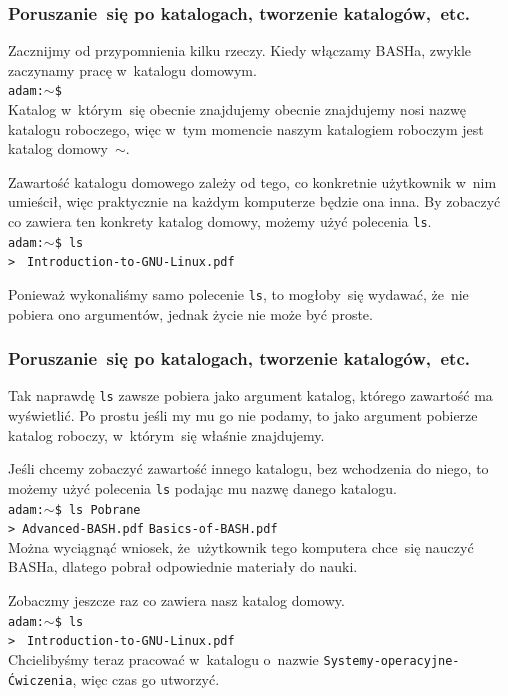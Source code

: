 \documentclass[10pt,t]{beamer}
\begin{document}
\begin{frame}
  \frametitle{Poruszanie~się po katalogach, tworzenie
    katalogów,~etc.}


  Zacznijmy od przypomnienia kilku rzeczy. Kiedy włączamy BASHa, zwykle
  zaczynamy pracę w~katalogu domowym. \\
  \texttt{adam:$\sim$\$} \\
  Katalog w~którym~się obecnie znajdujemy obecnie znajdujemy nosi nazwę
  katalogu roboczego, więc w~tym momencie naszym katalogiem roboczym jest
  katalog domowy~$\sim$.

  Zawartość katalogu domowego zależy od tego, co konkretnie użytkownik
  w~nim umieścił, więc praktycznie na każdym komputerze będzie ona inna.
  By zobaczyć co zawiera ten konkrety katalog domowy, możemy użyć polecenia
  \texttt{ls}. \\
  \texttt{adam:$\sim$\$ ls} \\
  \texttt{> } \quad
  \texttt{Introduction-to-GNU-Linux.pdf} \quad
  \texttt{}

  Ponieważ wykonaliśmy samo polecenie \texttt{ls}, to mogłoby~się wydawać,
  że~nie pobiera ono argumentów, jednak życie nie może być proste.

\end{frame}





\begin{frame}
  \frametitle{Poruszanie~się po katalogach, tworzenie
    katalogów,~etc.}


  Tak naprawdę \texttt{ls} zawsze pobiera jako argument katalog,
  którego zawartość ma wyświetlić. Po prostu jeśli my mu go nie podamy,
  to jako argument pobierze katalog roboczy, w~którym~się właśnie
  znajdujemy.

  Jeśli chcemy zobaczyć zawartość innego katalogu, bez wchodzenia do niego,
  to możemy użyć polecenia \texttt{ls} podając mu nazwę danego katalogu. \\
  \texttt{adam:$\sim$\$ ls Pobrane} \\
  \texttt{> Advanced-BASH.pdf} \quad
  \texttt{Basics-of-BASH.pdf} \\
  Można wyciągnąć wniosek, że~użytkownik tego komputera chce~się nauczyć
  BASHa, dlatego pobrał odpowiednie materiały do nauki.

  Zobaczmy jeszcze raz co zawiera nasz katalog domowy. \\
  \texttt{adam:$\sim$\$ ls} \\
  \texttt{> } \quad
  \texttt{Introduction-to-GNU-Linux.pdf} \quad
  \texttt{} \\
  Chcielibyśmy teraz pracować w~katalogu o~nazwie
  \texttt{Systemy-operacyjne-Ćwiczenia}, więc czas go utworzyć.

\end{frame}
\end{document}
